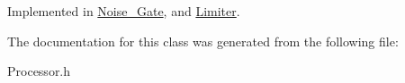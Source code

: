 Implemented in \hyperlink{classNoise__Gate_a1b30bc5ccc45774528a8f44ba0632291}{Noise\+\_\+\+Gate}, and \hyperlink{classLimiter_a7be62b79837918824c5a9c52b215d03d}{Limiter}.



The documentation for this class was generated from the following file\+:\begin{DoxyCompactItemize}
\item 
Processor.\+h\end{DoxyCompactItemize}
